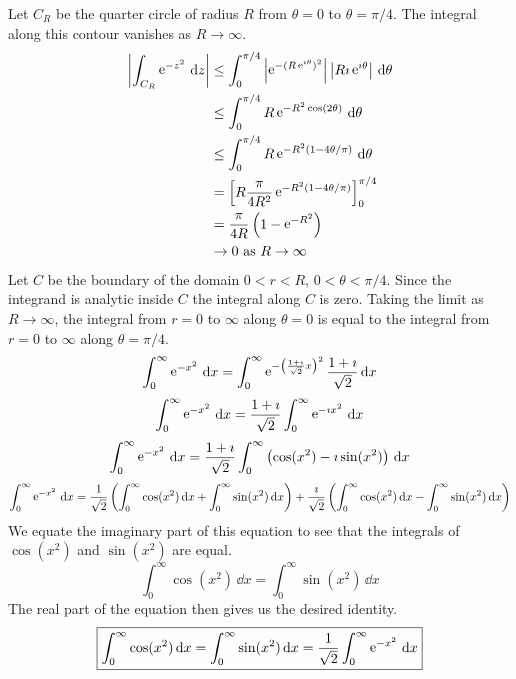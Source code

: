 {\begin{Solution}
  Let $C_R$ be the quarter circle of radius $R$ from $\theta = 0$ to 
  $\theta = \pi/4$.  The integral along this contour vanishes as 
  $R \to \infty$.
  \begin{align*}
    \left| \int_{C_R} \mathop{\mathrm{e}}\nolimits^{-z^2}\,\mathrm{d} z \right|
    &\leq \int_0^{\pi/4} \left| \mathop{\mathrm{e}}\nolimits^{-(R \mathop{\mathrm{e}}\nolimits^{\imath \theta})^2} \right| 
    \left| R \imath \mathop{\mathrm{e}}\nolimits^{\imath \theta} \right| \,\mathrm{d} \theta \\
    &\leq \int_0^{\pi/4} R \mathop{\mathrm{e}}\nolimits^{-R^2 \cos(2 \theta)} \,\mathrm{d} \theta \\
    &\leq \int_0^{\pi/4} R \mathop{\mathrm{e}}\nolimits^{-R^2 (1 - 4 \theta / \pi)} \,\mathrm{d} \theta \\
    &= \left[ R  \frac{\pi}{4 R^2} \mathop{\mathrm{e}}\nolimits^{-R^2 (1 - 4 \theta / \pi)} 
    \right]_0^{\pi/4} \\
    &= \frac{\pi}{4 R} \left( 1 - \mathop{\mathrm{e}}\nolimits^{-R^2} \right) \\
    &\to 0\ \mathrm{as}\ R \to \infty
  \end{align*}
  Let $C$ be the boundary of the domain $0 < r < R$, $0 < \theta < \pi / 4$.
  Since the integrand is analytic inside $C$ the integral along $C$ is 
  zero.  Taking the limit as $R \to \infty$, the integral from $r = 0$ to $\infty$
  along $\theta = 0$ is equal to the integral from $r = 0$ to $\infty$
  along $\theta = \pi / 4$.
  \[
  \int_0^\infty \mathop{\mathrm{e}}\nolimits^{-x^2}\,\mathrm{d} x 
  = \int_0^\infty \mathop{\mathrm{e}}\nolimits^{- \left(\frac{1 + \imath}{\sqrt{2}} x \right)^2 }
  \frac{1 + \imath}{\sqrt{2}} \,\mathrm{d} x
  \]
  \[
  \int_0^\infty \mathop{\mathrm{e}}\nolimits^{-x^2}\,\mathrm{d} x 
  = \frac{1 + \imath}{\sqrt{2}} \int_0^\infty \mathop{\mathrm{e}}\nolimits^{- \imath x^2 } \,\mathrm{d} x
  \]
  \[
  \int_0^\infty \mathop{\mathrm{e}}\nolimits^{-x^2}\,\mathrm{d} x 
  = \frac{1 + \imath}{\sqrt{2}} \int_0^\infty \left( \cos(x^2) - \imath \sin(x^2) 
  \right)\,\mathrm{d} x
  \]
  \[
  \int_0^\infty \mathop{\mathrm{e}}\nolimits^{-x^2}\,\mathrm{d} x 
  = \frac{1}{\sqrt{2}} 
  \left( \int_0^\infty \cos(x^2)\,\mathrm{d} x + \int_0^\infty \sin(x^2)\,\mathrm{d} x \right)
  + \frac{\imath}{\sqrt{2}}
  \left( \int_0^\infty \cos(x^2)\,\mathrm{d} x - \int_0^\infty \sin(x^2)\,\mathrm{d} x \right)
  \]
  We equate the imaginary part of this equation to see that the integrals 
  of $\cos(x^2)$ and $\sin(x^2)$ are equal.
  \[
  \int_0^\infty \cos(x^2)\,\dd x = \int_0^\infty \sin(x^2)\,\dd x
  \]
  The real part of the equation then gives us the desired identity.
  \[
  \boxed{
    \int_0^\infty \cos(x^2)\,\mathrm{d} x = \int_0^\infty \sin(x^2)\,\mathrm{d} x = \frac{1}{\sqrt{2}}
    \int_0^\infty \mathop{\mathrm{e}}\nolimits^{-x^2}\,\mathrm{d} x
    }
  \]
\end{Solution}



















}
